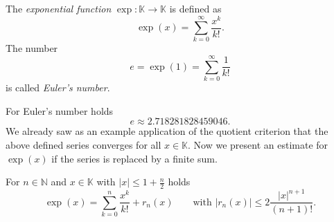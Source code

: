 


\begin{Definition}{}
 The \emph{exponential function} $\exp:\mathbb{K}\to\mathbb{K}$ is defined as
\[\exp(x)=\sum_{k=0}^\infty\frac{x^k}{k!}.\]
The number
\[e=\exp(1)=\sum_{k=0}^\infty\frac{1}{k!}\]
is called \emph{Euler's number}.
\end{Definition}
For Euler's number holds
\[e\approx 2.718281828459046.\]
We already saw as an example application of the quotient criterion that the above defined series converges for all $x\in\mathbb{K}$. 
Now we present an estimate for $\exp(x)$ if the series is replaced by a finite sum.
\begin{Theorem}{}\label{thm:expest}
 For $n\in\mathbb{N}$ and $x\in\mathbb{K}$ with $|x|\leq1+\frac{n}2$ holds
\[\exp(x)=\sum_{k=0}^n\frac{x^k}{k!}+r_n(x)\qquad\text{with }|r_n(x)|\leq2\frac{|x|^{n+1}}{(n+1)!}.\]
\end{Theorem}

